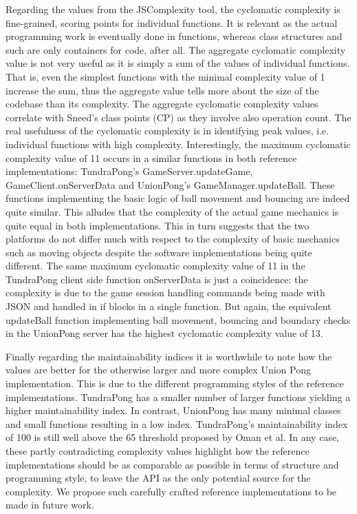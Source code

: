 \documentclass[conference]{IEEEtran}
\begin{document}
Regarding the values from the JSComplexity tool, the cyclomatic
complexity is fine-grained, scoring points for individual
functions. It is relevant as the actual programming work is eventually
done in functions, whereas class structures and such are only
containers for code, after all. The aggregate cyclomatic complexity
value is not very useful as it is simply a sum of the values of
individual functions. That is, even the simplest functions with the
minimal complexity value of 1 increase the sum, thus the aggregate
value tells more about the size of the codebase than its
complexity. The aggregate cyclomatic complexity values correlate with
Sneed’s class points (CP) as they involve also operation count. The
real usefulness of the cyclomatic complexity is in identifying peak
values, i.e. individual functions with high complexity. Interestingly,
the maximum cyclomatic complexity value of 11 occurs in a similar
functions in both reference implementations: TundraPong’s
GameServer.updateGame, GameClient.onServerData and UnionPong’s
GameManager.updateBall. These functions implementing the basic logic
of ball movement and bouncing are indeed quite similar. This alludes
that the complexity of the actual game mechanics is quite equal in
both implementations. This in turn suggests that the two platforms do
not differ much with respect to the complexity of basic mechanics such
as moving objects despite the software implementations being quite
different. The same maximum cyclomatic complexity value of 11 in the
TundraPong client side function onServerData is just a coincidence:
the complexity is due to the game session handling commands being made
with JSON and handled in if blocks in a single function. But again,
the equivalent updateBall function implementing ball movement,
bouncing and boundary checks in the UnionPong server has the highest
cyclomatic complexity value of 13.

Finally regarding the maintainability indices it is worthwhile to note
how the values are better for the otherwise larger and more complex
Union Pong implementation. This is due to the different programming
styles of the reference implementations. TundraPong has a smaller
number of larger functions yielding a higher maintainability index. In
contrast, UnionPong has many minimal classes and small functions
resulting in a low index. TundraPong’s maintainability index of 100 is
still well above the 65 threshold proposed by Oman et al. In any case,
these partly contradicting complexity values highlight how the
reference implementations should be as comparable as possible in terms
of structure and programming style, to leave the API as the only
potential source for the complexity. We propose such carefully crafted
reference implementations to be made in future work.
\end{document}
